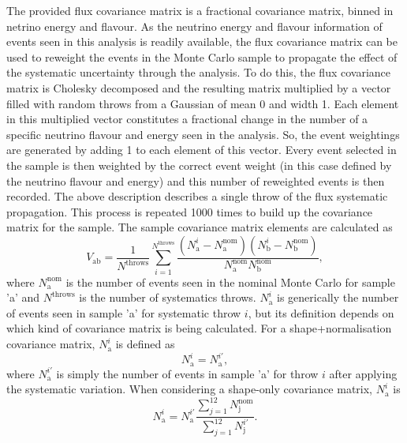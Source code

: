 The provided flux covariance matrix is a fractional covariance matrix, binned in netrino energy and flavour.  As the neutrino energy and flavour information of events seen in this analysis is readily available, the flux covariance matrix can be used to reweight the events in the Monte Carlo sample to propagate the effect of the systematic uncertainty through the analysis.  To do this, the flux covariance matrix is Cholesky decomposed and the resulting matrix multiplied by a vector filled with random throws from a Gaussian of mean 0 and width 1.  Each element in this multiplied vector constitutes a fractional change in the number of a specific neutrino flavour and energy seen in the analysis.  So, the event weightings are generated by adding 1 to each element of this vector.  Every event selected in the sample is then weighted by the correct event weight (in this case defined by the neutrino flavour and energy) and this number of reweighted events is then recorded.  The above description describes a single throw of the flux systematic propagation.  This process is repeated 1000 times to build up the covariance matrix for the sample.  The sample covariance matrix elements are calculated as
\begin{equation}
  V_{\textrm{ab}} = \frac{1}{N^{\textrm{throws}}}\sum^{N^{\textrm{throws}}}_{i=1}\frac{\left(N_{\textrm{a}}^{i} - N_{\textrm{a}}^{\textrm{nom}}\right)\left(N_{\textrm{b}}^{i} - N_{\textrm{b}}^{\textrm{nom}}\right)}{N_{\textrm{a}}^{\textrm{nom}}N_{\textrm{b}}^{\textrm{nom}}},
  \label{eqn:CovarianceMatrixElementDef}
\end{equation}
where $N_{\textrm{a}}^{\textrm{nom}}$ is the number of events seen in the nominal Monte Carlo for sample 'a' and $N^{\textrm{throws}}$ is the number of systematics throws. $N_{\textrm{a}}^{i}$ is generically the number of events seen in sample 'a' for systematic throw $i$, but its definition depends on which kind of covariance matrix is being calculated.  For a shape+normalisation covariance matrix, $N_{\textrm{a}}^{i}$ is defined as 
\begin{equation}
  N_{\textrm{a}}^{i} = N^{i\prime}_{\textrm{a}}, 
  \label{eqn:NVariedDef}
\end{equation}
where $N^{i\prime}_{\textrm{a}}$ is simply the number of events in sample 'a' for throw $i$ after applying the systematic variation.  When considering a shape-only covariance matrix, $N_{\textrm{a}}^{i}$ is 
\begin{equation}
  N_{\textrm{a}}^{i} = N^{i\prime}_{\textrm{a}}\frac{\displaystyle\sum_{j=1}^{12}N_{\textrm{j}}^{\textrm{nom}}}{\displaystyle\sum_{j=1}^{12}N^{i\prime}_{\textrm{j}}}. 
  \label{eqn:NVariedShapeOnlyDef}
\end{equation}
